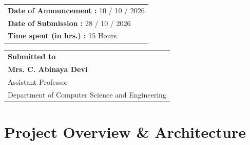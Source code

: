 \documentclass[11pt,a4paper]{article}
\begin{document}
\begin{titlepage}
    \vfill
    
    \noindent
    \begin{minipage}[b]{0.48\textwidth}
        \centering
        \begin{tabular}{|p{6.8cm}|}
            \hline
            \vspace{0.15cm}
            \textbf{Date of Announcement :} \hspace{0.2cm} 10 / 10 / 2026 \\[0.25cm]
            \textbf{Date of Submission \hspace{0.45cm}:} \hspace{0.2cm} 28 / 10 / 2026 \\[0.25cm]
            \textbf{Time spent (in hrs.) \hspace{0.4cm}:} \hspace{0.2cm} 15 Hours \\[0.15cm]
            \hline
        \end{tabular}
    \end{minipage}
    \hfill
    \begin{minipage}[b]{0.48\textwidth}
        \centering
        \begin{tabular}{|p{6.8cm}|}
            \hline
            \vspace{0.1cm}
            \centering \textbf{Submitted to} \\[0.2cm]
            \centering \textbf{Mrs. C. Abinaya Devi} \\
            \centering Assistant Professor \\
            \centering Department of Computer Science and Engineering \\[0.1cm]
            \hline
        \end{tabular}
    \end{minipage}
    \vspace*{0.6cm}
\end{titlepage}

\newpage
\tableofcontents
\newpage

\section{Project Overview \& Architecture}
\end{document}
